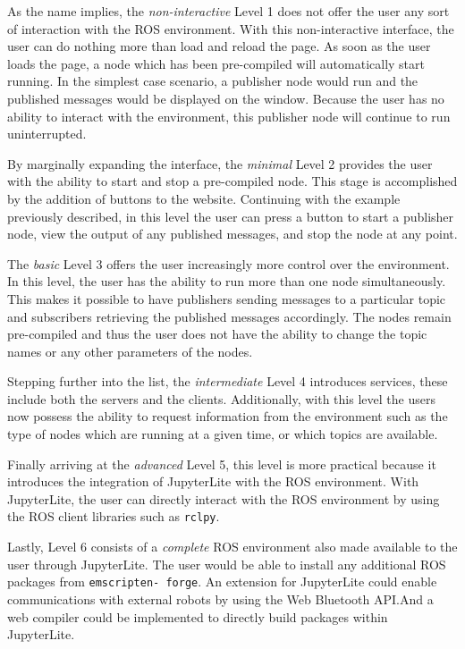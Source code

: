         As the name implies, the \textit{non-interactive} Level 1 does not offer the user
        any sort of interaction with the \ac{ROS} environment. With this non-interactive
        interface, the user can do nothing more than load and reload the page. 
        As soon as the user loads the page, a node which has been pre-compiled 
        will automatically start running. In the simplest case scenario, a publisher
        node would run and the published messages would be displayed on the window.
        Because the user has no ability to interact with the environment, this
        publisher node will continue to run uninterrupted. 


        By marginally expanding the interface, the \textit{minimal} Level 2 provides
        the user with the ability to start and stop a pre-compiled node. This 
        stage is accomplished by the addition of buttons to the website. Continuing
        with the example previously described, in this level the user can press
        a button to start a publisher node, view the output of any published 
        messages, and stop the node at any point. 

        The \textit{basic} Level 3 offers the user increasingly more control over
        the environment. In this level, the user has the ability to run more than
        one node simultaneously. This makes it possible to have publishers sending
        messages to a particular topic and subscribers retrieving the published
        messages accordingly. The nodes remain pre-compiled and thus the user does not have the ability to change the topic names or any other parameters of the nodes.

        Stepping further into the list, the \textit{intermediate} Level 4 introduces
        services, these include both the servers and the clients. Additionally,
        with this level the users now possess the ability to request information
        from the environment such as the type of nodes which are running at a
        given time, or which topics are available. 

        Finally arriving at the \textit{advanced} Level 5, this level is more practical because it introduces the integration of JupyterLite with the 
        ROS environment. With JupyterLite, the user can directly interact with
        the ROS environment by using the ROS client libraries such as \texttt{rclpy}.
        
        Lastly, Level 6 consists of a \textit{complete} ROS environment also made available to the user through JupyterLite. The user would be able to install any additional ROS packages from \texttt{emscripten- forge}. An extension for JupyterLite could enable communications with external robots by using the Web Bluetooth API.\@ And a web compiler could be implemented to directly build packages within JupyterLite.

